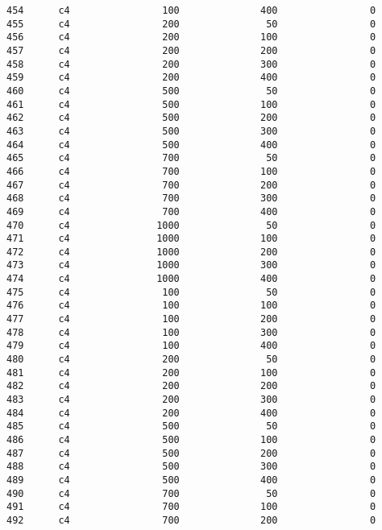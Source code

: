 \documentclass[11pt]{article}
\begin{document}
\begin{Verbatim}[commandchars=\\\{\}]
454      c4                100              400                0   
455      c4                200               50                0   
456      c4                200              100                0   
457      c4                200              200                0   
458      c4                200              300                0   
459      c4                200              400                0   
460      c4                500               50                0   
461      c4                500              100                0   
462      c4                500              200                0   
463      c4                500              300                0   
464      c4                500              400                0   
465      c4                700               50                0   
466      c4                700              100                0   
467      c4                700              200                0   
468      c4                700              300                0   
469      c4                700              400                0   
470      c4               1000               50                0   
471      c4               1000              100                0   
472      c4               1000              200                0   
473      c4               1000              300                0   
474      c4               1000              400                0   
475      c4                100               50                0   
476      c4                100              100                0   
477      c4                100              200                0   
478      c4                100              300                0   
479      c4                100              400                0   
480      c4                200               50                0   
481      c4                200              100                0   
482      c4                200              200                0   
483      c4                200              300                0   
484      c4                200              400                0   
485      c4                500               50                0   
486      c4                500              100                0   
487      c4                500              200                0   
488      c4                500              300                0   
489      c4                500              400                0   
490      c4                700               50                0   
491      c4                700              100                0   
492      c4                700              200                0   

\end{Verbatim}
\end{document}
